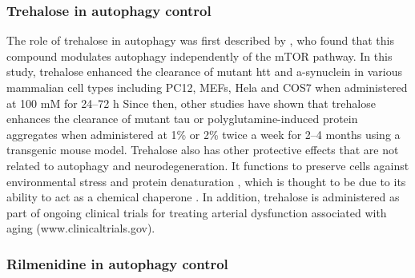 \subsubsection{Trehalose in autophagy control}
The role of trehalose in autophagy was first described by \citet{Sarkar2007,Sarkar2007a}, who found that this compound modulates autophagy independently of the mTOR pathway. In this study, trehalose enhanced the clearance of mutant htt and a-synuclein in various mammalian cell types including PC12, MEFs, Hela and COS7 when administered at 100 mM for 24–72 h \citet{Sarkar2007,Sarkar2007a} Since then, other studies have shown that trehalose enhances the clearance of mutant tau \citep{Rodriguez-Navarro2010,Schaeffer2012} or polyglutamine-induced protein aggregates \citep{Tanaka2004} when administered at 1\% or 2\% twice a week for 2–4 months using a transgenic mouse model. Trehalose also has other protective effects that are not related to autophagy and neurodegeneration. It functions to preserve cells against environmental stress and protein denaturation \citep{Chen2004,Gonzalez-Polo2015}, which is thought to be due to its ability to act as a chemical chaperone \citep{Sarkar2007}. In addition, trehalose is administered as part of ongoing clinical trials for treating arterial dysfunction associated with aging (www.clinicaltrials.gov).

\subsubsection{Rilmenidine in autophagy control}

